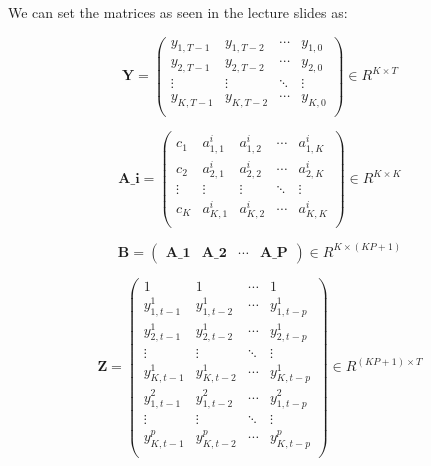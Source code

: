 \documentclass[11pt]{article}
\begin{document}
    We can set the matrices as seen in the lecture slides as:

\begin{equation}
    \textbf{Y} = 
    \begin{pmatrix}
        y_{1,T-1} & y_{1,T-2} & \cdots & y_{1,0} \\
        y_{2,T-1} & y_{2,T-2} & \cdots & y_{2,0} \\
        \vdots        &       \vdots  & \ddots &       \vdots \\
        y_{K,T-1} & y_{K,T-2} & \cdots & y_{K,0} \\ 
    \end{pmatrix} \in R^{K \times T}
\end{equation}

\begin{equation}
    \textbf{A_i} =
        \begin{pmatrix}
        c_{1}      &      a_{1,1}^{i} & a_{1,2}^{i} & \cdots & a_{1,K}^{i}\\
        c_{2}      &      a_{2,1}^{i} & a_{2,2}^{i} & \cdots & a_{2,K}^{i}\\
        \vdots     &      \vdots      & \vdots      & \ddots & \vdots     \\
        c_{K}      &      a_{K,1}^{i} & a_{K,2}^{i} & \cdots & a_{K,K}^{i}\\ 
    \end{pmatrix} \in R^{K \times K}
\end{equation}

\begin{equation}
    \textbf{B} = 
    \begin{pmatrix}
        \textbf{A_1} & \textbf{A_2} & \cdots & \textbf{A_P}
    \end{pmatrix} \in R^{K \times (KP + 1)}
\end{equation}

\begin{equation}
    \textbf{Z} = 
    \begin{pmatrix}
            1             &        1      & \cdots &     1     \\
        y_{1,t-1}^{1} & y_{1,t-2}^{1} & \cdots & y_{1,t-p}^{1} \\
        y_{2,t-1}^{1} & y_{2,t-2}^{1} & \cdots & y_{2,t-p}^{1} \\
        \vdots        &       \vdots  & \ddots &       \vdots \\
        y_{K,t-1}^{1} & y_{K,t-2}^{1} & \cdots & y_{K,t-p}^{1} \\
        y_{1,t-1}^{2} & y_{1,t-2}^{2} & \cdots & y_{1,t-p}^{2} \\
        \vdots        &       \vdots  & \ddots &       \vdots \\
        y_{K,t-1}^{p} & y_{K,t-2}^{p} & \cdots & y_{K,t-p}^{p} \\ 
    \end{pmatrix} \in R^{(KP + 1) \times T}
\end{equation}
\end{document}
